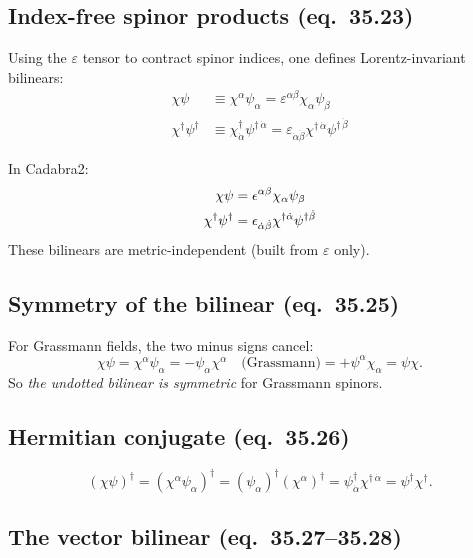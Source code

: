 \subsection{Index-free spinor products (eq.~35.23)}

Using the $\varepsilon$ tensor to contract spinor indices, one defines
Lorentz-invariant bilinears:
\begin{align}
  \chi\psi &\equiv \chi^\alpha\psi_\alpha
  = \varepsilon^{\alpha\beta}\chi_\alpha\psi_\beta
  \tag{35.23a}\\
  \chi^\dagger\psi^\dagger
  &\equiv \chi^\dagger_{\dot\alpha}\psi^{\dagger\,\dot\alpha}
  = \varepsilon_{\dot\alpha\dot\beta}\chi^{\dagger\,\dot\alpha}\psi^{\dagger\,\dot\beta}
  \tag{35.23b}
\end{align}

In Cadabra2:
\begin{align*}
  \chi\psi &= \epsilon^{\alpha \beta} \chi_{\alpha} \psi_{\beta} \\
  \chi^\dagger\psi^\dagger &= \epsilon_{\dot{\alpha} \dot{\beta}} \chi^{\dagger\dot{\alpha}} \psi^{\dagger\dot{\beta}}
\end{align*}
These bilinears are metric-independent (built from $\varepsilon$ only).

\subsection{Symmetry of the bilinear (eq.~35.25)}

For Grassmann fields, the two minus signs cancel:
\begin{equation}
  \chi\psi = \chi^\alpha\psi_\alpha
  = -\psi_\alpha\chi^\alpha \quad\text{(Grassmann)}
  = +\psi^\alpha\chi_\alpha = \psi\chi.
  \tag{35.25}
\end{equation}
So \emph{the undotted bilinear is symmetric} for Grassmann spinors.

\subsection{Hermitian conjugate (eq.~35.26)}

\begin{equation}
  (\chi\psi)^\dagger = (\chi^\alpha\psi_\alpha)^\dagger
  = (\psi_\alpha)^\dagger(\chi^\alpha)^\dagger
  = \psi^\dagger_{\dot\alpha}\chi^{\dagger\,\dot\alpha}
  = \psi^\dagger\chi^\dagger.
  \tag{35.26}
\end{equation}

\subsection{The vector bilinear (eq.~35.27--35.28)}

